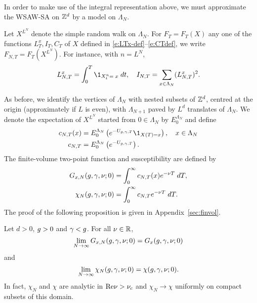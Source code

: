 In order to make use of the integral representation above, we must approximate the
WSAW-SA on ${ {{\mathbb Z}}^d }$ by a model on $\Lambda_N$.

Let $X^{L^N}$ denote the simple random walk on $\Lambda_N$.
For $F_T = F_T(X)$ any one of the functions $L_T^x,I_T,C_T$
of $X$ defined in \eqref{e:LTx-def}--\eqref{e:CTdef},
we write $F_{N,T} = F_T(X^{L^N})$. For instance, with $n=L^N$,
\begin{equation}
    L^x_{N,T} = \int_0^T \1_{X^{n}_t=\;x} \; dt,
    \quad I_{N,T} = \sum_{x \in \Lambda_N}(L_{N,T}^x)^2 .
\end{equation}

As before, we identify the vertices of $\Lambda_N$ with nested subsets of ${ {{\mathbb Z}}^d }$,
centred at the origin (approximately if $L$ is even),
with $\Lambda_{N+1}$ paved by $L^d$ translates of $\Lambda_N$.
We denote the expectation of $X^{L^N}$ started from $0 \in \Lambda_N$ by $E^{\Lambda_N}_0$
and define
\begin{align}
\label{e:cN}
c_{N,T}(x)
    &= E^{\Lambda_N}_0 \left( e^{-U_{\gcc,\gamma,T}} \newer{\1_{X(T)=x}} \right),
    \quad x \in \Lambda_N \\
c_{N,T}
    &= E^{\Lambda_N}_0 \left( e^{-U_{\gcc,\gamma,T}} \right).
\end{align}
The finite-volume two-point function and susceptibility
are defined by
\begin{align}
G_{x,N}(g,\gamma,\nu; 0)
    &=
\int_0^\infty c_{N,T}(x) e^{-\nu T} \; dT, \\
\label{e:chiNdef-pre}
\chi_N(g, \gamma, \nu; 0)
    &=
\int_0^\infty c_{N,T} e^{-\nu T} \; dT.
\end{align}
The proof of the following proposition is given in Appendix~\ref{sec:finvol}.

\begin{prop}
\label{prop:finvol}
Let $d >0$, $g >0$ and $\gamma < g$. For all $\nu \in {\mathbb R}$,
\begin{equation}
\label{e:Givlc}
\lim_{N \rightarrow \infty}
G_{x,N}(g,\gamma,\nu; 0)
=
G_x(g,\gamma,\nu; 0)
\end{equation}
and
\begin{equation}
\label{e:chilim-pre}
\lim_{N\rightarrow\infty}\chi_N(g,\gamma,\nu; 0) =   \chi(g,\gamma,\nu; 0).
\end{equation}
In fact, $\chi_N$ and $\chi$ are analytic in ${\rm Re} \nu > \nu_c$ and
$\chi_N \to \chi$ uniformly on compact subsets of this domain.
\end{prop}

